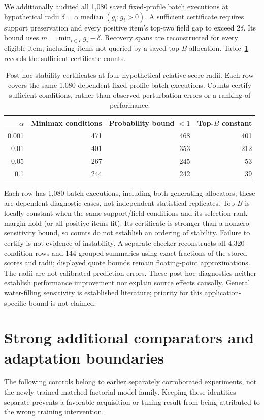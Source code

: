 \documentclass[11pt]{article}
\begin{document}
We additionally audited all 1,080 saved fixed-profile batch executions at
hypothetical radii $\delta=\alpha\operatorname{median}(g_i:g_i>0)$.
A sufficient certificate requires support preservation and every positive
item's top-two field gap to exceed $2\delta$. Its bound uses
$m=\min_{i\in I}g_i-\delta$. Recovery spans are reconstructed for every
eligible item, including items not queried by a saved top-$B$ allocation.
Table~\ref{tab:stability} records the sufficient-certificate counts.
\begin{table}[htbp]\centering
\begin{tabular}{rrrr}
\toprule
$\alpha$ & Minimax conditions & Probability bound $<1$ & Top-$B$ constant\\
\midrule
0.001 & 471 & 468 & 401\\
0.01 & 401 & 353 & 212\\
0.05 & 267 & 245 & 53\\
0.1 & 244 & 242 & 39\\
\bottomrule
\end{tabular}
\caption{Post-hoc stability certificates at four hypothetical relative score radii. Each row covers the same 1,080 dependent fixed-profile batch executions. Counts certify sufficient conditions, rather than observed perturbation errors or a ranking of performance.}\label{tab:stability}\end{table}
Each row has 1,080 batch executions, including both generating allocators;
these are dependent diagnostic cases, not independent statistical replicates.
Top-$B$ is locally constant when the same support/field conditions and its
selection-rank margin hold (or all positive items fit). Its certificate is
stronger than a nonzero sensitivity bound, so counts do not establish an
ordering of stability. Failure to certify is not evidence of instability.
A separate checker reconstructs all 4,320 condition rows and 144 grouped
summaries using exact fractions of the stored scores and radii; displayed
quote bounds remain floating-point approximations. The radii are not calibrated
prediction errors. These post-hoc diagnostics neither establish performance
improvement nor explain source effects causally. General water-filling
sensitivity is established literature; priority for this application-specific
bound is not claimed.

\section{Strong additional comparators and adaptation boundaries}\label{app:comparators}
The following controls belong to earlier separately corroborated experiments,
not the newly trained matched factorial model family. Keeping these identities
separate prevents a favorable acquisition or tuning result from being attributed
to the wrong training intervention.
\end{document}
